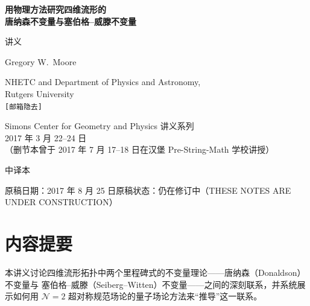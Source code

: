 
\begin{titlepage}
\centering
\vspace*{2.2cm}

{\LARGE\bfseries 用物理方法研究四维流形的\\[0.35em]
唐纳森不变量与塞伯格--威滕不变量\par}

\vspace{1.0cm}

{\large 讲义\par}

\vspace{1.6cm}

{\Large Gregory W.\ Moore\par}
\vspace{0.5em}
{\normalsize NHETC and Department of Physics and Astronomy,\\
Rutgers University\\
\texttt{[邮箱隐去]}\par}

\vspace{2.2cm}

{\normalsize
Simons Center for Geometry and Physics 讲义系列\\
2017 年 3 月 22--24 日\\
（删节本曾于 2017 年 7 月 17--18 日在汉堡 Pre-String-Math 学校讲授）\par}

\vspace{1.2cm}
{\normalsize 中译本\par}

\vfill
{\small 原稿日期：2017 年 8 月 25 日\quad 原稿状态：仍在修订中（THESE NOTES ARE UNDER CONSTRUCTION）\par}
\vspace{0.6cm}
\end{titlepage}

\section*{内容提要}

本讲义讨论四维流形拓扑中两个里程碑式的不变量理论——唐纳森（Donaldson）不变量与
塞伯格--威滕（Seiberg--Witten）不变量——之间的深刻联系，并系统展示如何用
$\mathcal{N}=2$ 超对称规范场论的量子场论方法来“推导”这一联系。

